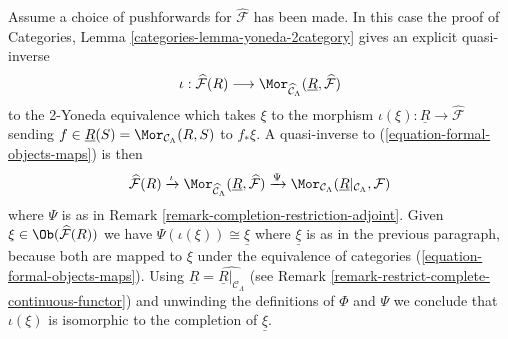 \begin{remark}
\medskip\noindent
Assume a choice of pushforwards for $\widehat{\mathcal{F}}$ has been made.
In this case the proof of
Categories, Lemma \ref{categories-lemma-yoneda-2category}
gives an explicit quasi-inverse
$$
\iota :
\widehat{\mathcal{F}}(R) \longrightarrow
\Mor_{\widehat{\mathcal{C}}_\Lambda}(
\underline{R}, \widehat{\mathcal{F}})
$$
to the 2-Yoneda equivalence which takes $\xi$ to the morphism
$\iota(\xi) : \underline{R} \to \widehat{\mathcal{F}}$ sending
$f \in \underline{R}(S) = \Mor_{\mathcal{C}_\Lambda}(R, S)$
to $f_*\xi$. A quasi-inverse to (\ref{equation-formal-objects-maps})
is then
$$
\widehat{\mathcal{F}}(R)
\xrightarrow {\iota}
\Mor_{\widehat{\mathcal{C}}_\Lambda}(
\underline{R}, \widehat{\mathcal{F}})
\xrightarrow{\Psi}
\Mor_{\mathcal{C}_\Lambda}(
\underline{R}|_{\mathcal{C}_\Lambda}, \mathcal{F})
$$
where $\Psi$ is as in
Remark \ref{remark-completion-restriction-adjoint}.
Given $\xi \in \Ob(\widehat{\mathcal{F}}(R))$ we have
$\Psi(\iota(\xi)) \cong \underline{\xi}$ where $\underline{\xi}$
is as in the previous paragraph, because both are mapped to $\xi$
under the equivalence of categories (\ref{equation-formal-objects-maps}).
Using $\underline{R} = \widehat{\underline{R}|_{\mathcal{C}_\Lambda}}$
(see Remark \ref{remark-restrict-complete-continuous-functor})
and unwinding the definitions of $\Phi$ and $\Psi$ we conclude that
$\iota(\xi)$ is isomorphic to the completion of $\underline{\xi}$.
\end{remark}


